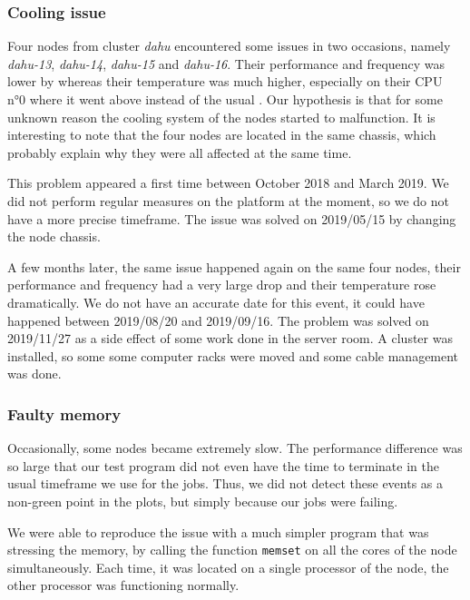             \subsubsection{Cooling issue}%

                Four nodes from cluster \emph{dahu} encountered some issues in two occasions, namely \emph{dahu-13},
                \emph{dahu-14}, \emph{dahu-15} and \emph{dahu-16}. Their performance and frequency was lower by
                 whereas their temperature was much higher, especially on their CPU n°0 where it went
                above  instead of the usual . Our hypothesis is that for some
                unknown reason the cooling system of the nodes started to malfunction. It is interesting to note that
                the four nodes are located in the same chassis, which probably explain why they were all affected at the
                same time.

                This problem appeared a first time between October 2018 and March 2019. We did not perform regular
                measures on the platform at the moment, so we do not have a more precise timeframe. The issue was solved
                on 2019/05/15 by changing the node chassis.

                A few months later, the same issue happened again on the same four nodes, their performance and
                frequency had a very large drop and their temperature rose dramatically. We do not have an accurate date
                for this event, it could have happened between 2019/08/20 and 2019/09/16. The problem was solved on
                2019/11/27 as a side effect of some work done in the server room. A cluster was installed, so some some
                computer racks were moved and some cable management was done.

            \subsubsection{Faulty memory}%

                Occasionally, some nodes became extremely slow. The performance difference was so large that our test
                program did not even have the time to terminate in the usual timeframe we use for the jobs. Thus, we
                did not detect these events as a non-green point in the plots, but simply because our jobs were failing.

                We were able to reproduce the issue with a much simpler program that was stressing the memory, by
                calling the function \texttt{memset} on all the cores of the node simultaneously. Each time, it was
                located on a single processor of the node, the other processor was functioning normally.


